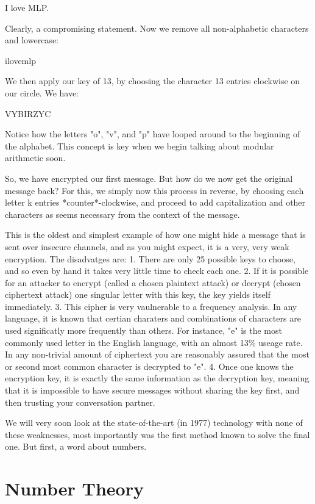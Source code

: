 \documentclass{article}
\begin{document}
        I love MLP.
        
        Clearly, a compromising statement.  Now we remove all non-alphabetic characters and lowercase:
        
        ilovemlp
        
        We then apply our key of 13, by choosing the character 13 entries clockwise on our circle.  
        We have:
        
        VYBIRZYC
        
        Notice how the letters "o", "v", and "p" have looped around to the beginning of the alphabet.  
        This concept is key when we begin talking about modular arithmetic soon.
        
        So, we have encrypted our first message.  But how do we now get the original message back?  
        For this, we simply now this process in reverse, by choosing each letter k entries *counter*-clockwise, and proceed to add capitalization and other characters as seems necessary from the context of the message.
        
        This is the oldest and simplest example of how one might hide a message that is sent over insecure channels, and as you might expect, it is a very, very weak encryption.
        The disadvatges are:
        1. There are only 25 possible keys to choose, and so even by hand it takes very little time to check each one.
        2. If it is possible for an attacker to encrypt (called a chosen plaintext attack) or decrypt (chosen ciphertext attack) one singular letter with this key, the key yields itself immediately.
        3. This cipher is very vaulnerable to a frequency analysis.  In any language, it is known that certian charaters and combinations of characters are used significatly more frequently than others.  For instance, "e" is the most commonly used letter in the English language, with an almost 13\% useage rate.  In any non-trivial amount of ciphertext you are reasonably assured that the most or second most common character is decrypted to "e".
        4. Once one knows the encryption key, it is exactly the same information as the decryption key, meaning that it is impossible to have secure messages without sharing the key first, and then trusting your conversation partner.  
        
        We will very soon look at the state-of-the-art (in 1977) technology with none of these weaknesses, most importantly was the first method known to solve the final one.  
        But first, a word about numbers.
        
    \section{Number Theory}
        
        
\end{document}
